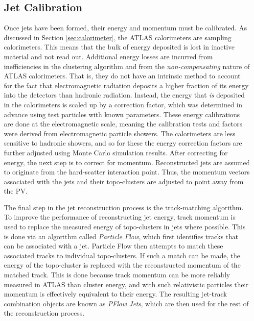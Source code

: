         \FloatBarrier
        \subsection{Jet Calibration} \label{sec:jet_calibration}

        Once jets have been formed, their energy and momentum must be calibrated.
        As discussed in Section \ref{sec:calorimeter}, the ATLAS calorimeters are sampling calorimeters.
        This means that the bulk of energy deposited is lost in inactive material and not read out.
        Additional energy losses are incurred from inefficiencies in the clustering algorithm and from the \textit{non-compensating} nature of ATLAS calorimeters.
        That is, they do not have an intrinsic method to account for the fact that electromagnetic radiation deposits a higher fraction of its energy into the detectors than hadronic radiation\cite{cell_clustering}.
        Instead, the energy that \textit{is} deposited in the calorimeters is scaled up by a correction factor,
            which was determined in advance using test particles with known parameters\cite{jet_energy_measurment}.
        These energy calibrations are done at the electromagnetic scale,
            meaning the calibration tests and factors were derived from electromagnetic particle showers.
        The calorimeters are less sensitive to hadronic showers,
            and so for these the energy correction factors are further adjusted using Monte Carlo simulation results.
        After correcting for energy, the next step is to correct for momentum.
        Reconstructed jets are assumed to originate from the hard-scatter interaction point.
        Thus, the momentum vectors associated with the jets and their topo-clusters are adjusted to point away from the PV.

        The final step in the jet reconstruction process is the track-matching algorithm.
        To improve the performance of reconstructing jet energy,
            track momentum is used to replace the measured energy of topo-clusters in jets where possible.
        This is done via an algorithm called \textit{Particle Flow},
            which first identifies tracks that can be associated with a jet.
        Particle Flow then attempts to match these associated tracks to individual topo-clusters.
        If such a match can be made, the energy of the topo-cluster is replaced with the reconstructed momentum of the matched track.
        This is done because track momentum can be more reliably measured in ATLAS than cluster energy,
            and with such relativistic particles their momentum is effectively equivalent to their energy.
        The resulting jet-track combination objects are known as \textit{PFlow Jets},
            which are then used for the rest of the reconstruction process\cite{pflow}.


